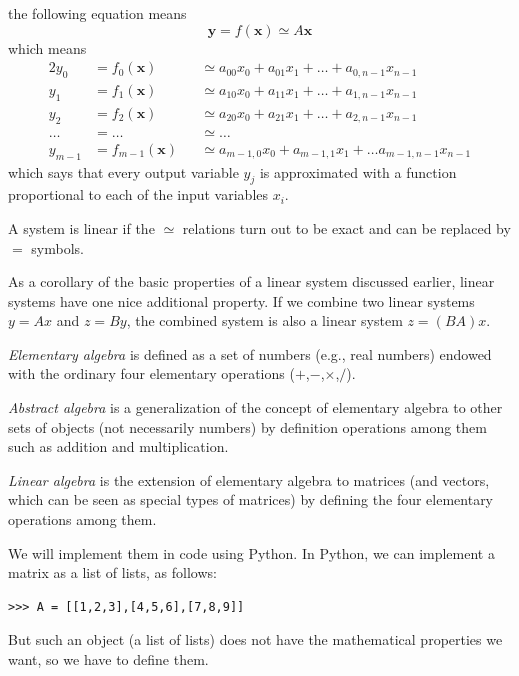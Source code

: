 \documentclass[justified,sixbynine]{tufte-book}
\theoremstyle{plain}%
\theoremstyle{definition}
\theoremstyle{remark}
\begin{document}
\begin{fullwidth}
the following equation means
\begin{equation}
\mathbf{y} = f(\mathbf{x}) \simeq A \mathbf{x}
\end{equation}
which means
\begin{alignat}{2}
y_0 &= f_0(\mathbf{x}) &&\simeq a_{00} x_0 + a_{01} x_1 + \dots + a_{0,n-1}x_{n-1} \\
y_1 &= f_1(\mathbf{x}) &&\simeq a_{10} x_0 + a_{11} x_1 + \dots + a_{1,n-1}x_{n-1} \\
y_2 &= f_2(\mathbf{x}) &&\simeq a_{20} x_0 + a_{21} x_1 + \dots + a_{2,n-1}x_{n-1} \\
\dots &= \dots &&\simeq \dots \\
y_{m-1} &= f_{m-1}(\mathbf{x}) &&\simeq a_{m-1,0} x_0 + a_{m-1,1} x_1 +\dots 
a_{m-1,n-1}x_{n-1}
\end{alignat}
which says that every output variable $y_j$ is approximated with a function proportional to each of the input variables $x_i$.

A system is linear if the $\simeq$ relations turn out to be exact and can be replaced by $=$ symbols.

As a corollary of the basic properties of a linear system discussed earlier, linear systems have one nice additional property. If we combine two linear systems $y=Ax$ and $z=By$, the combined system is also a linear system $z = (BA)x$.


{\it Elementary algebra} is defined as a set of numbers (e.g., real numbers) endowed with the ordinary four elementary operations ($+$,$-$,$\times$,$/$).

{\it Abstract algebra} is a generalization of the concept of elementary algebra to other sets of objects (not necessarily numbers) by definition operations among them such as addition and multiplication.

{\it Linear algebra} is the extension of elementary algebra to matrices (and vectors, which can be seen as special types of matrices) by defining the four elementary operations among them.

We will implement them in code using Python.
In Python, we can implement a matrix as a list of lists, as follows:
\begin{lstlisting}
>>> A = [[1,2,3],[4,5,6],[7,8,9]]
\end{lstlisting}
But such an object (a list of lists) does not have the mathematical properties we want, so we have to define them.


\end{fullwidth}
\end{document}
